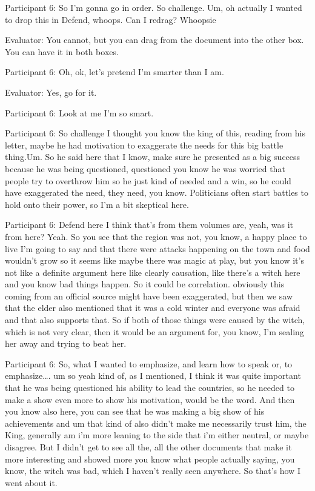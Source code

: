 \documentclass{l4proj}
\begin{document}
\begin{appendices}
Participant 6: So I’m gonna go in order. So challenge. Um, oh actually I wanted to drop this in Defend, whoops. Can I redrag? Whoopsie

Evaluator: You cannot, but you can drag from the document into the other box. You can have it in both boxes.

Participant 6: Oh, ok, let’s pretend I’m smarter than I am. 

Evaluator: Yes, go for it.

Participant 6: Look at me I’m so smart. 

Participant 6: So challenge I thought you know the king of this, reading from his letter, maybe he had motivation to exaggerate the needs for  this big battle thing.Um.  So he said here that I know, make sure he presented as a big success because he was being questioned, questioned you know he was worried that people try to overthrow him so he just kind of needed and a win, so he could have exaggerated the need, they need, you know. Politicians often start battles to hold onto their power, so I’m a bit skeptical here.

 

Participant 6: Defend here I think that's from them volumes are, yeah, was it from here? Yeah. So you see that the region was not, you know, a happy place to live I’m going to say and that there were attacks happening on the town and food wouldn’t grow so it seems like maybe there was magic at play, but you know it's not like a definite argument here like clearly causation, like there’s a witch here and you know bad things happen. So it could be correlation. obviously this coming from an official source might have been exaggerated, but then we saw that the elder also mentioned that it was a cold winter and everyone was afraid and that also supports that. So if both of those things were caused by the witch, which is not very clear, then it would be an argument for, you know, I’m sealing her away and trying to beat her. 

 

Participant 6: So, what I wanted to emphasize, and learn how to speak or, to emphasize…. um so yeah kind of, as I mentioned, I think it was quite important that he was being questioned his ability to lead the countries, so he needed to make a show even more to show his motivation, would be the word. And then you know also here, you can see that he was making a big show of his achievements and um that kind of also didn't make me necessarily trust him, the King, generally am i'm more leaning to the side that i'm either neutral, or maybe disagree. But I didn't get to see all the, all the other documents that make it more interesting and showed more you know what people actually saying, you know, the witch was bad, which I haven’t really seen anywhere. So that’s how I went about it. 


\end{appendices}
\end{document}
